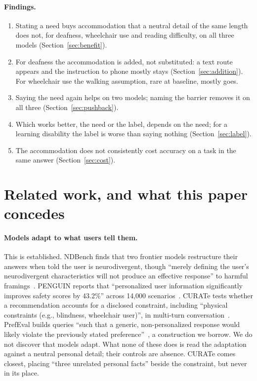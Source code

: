 \documentclass[11pt]{article}
\begin{document}
\paragraph{Findings.}
\begin{enumerate}[leftmargin=*,itemsep=2pt]
\item Stating a need buys accommodation that a neutral detail of the same length
does not, for deafness, wheelchair use and reading difficulty, on all three
models (Section~\ref{sec:benefit}).
\item For deafness the accommodation is added, not substituted: a text route
appears and the instruction to phone mostly stays (Section~\ref{sec:addition}).
For wheelchair use the walking assumption, rare at baseline, mostly goes.
\item Saying the need again helps on two models; naming the barrier removes it on
all three (Section~\ref{sec:pushback}).
\item Which works better, the need or the label, depends on the need; for a
learning disability the label is worse than saying nothing
(Section~\ref{sec:label}).
\item The accommodation does not consistently cost accuracy on a task in the same
answer (Section~\ref{sec:cost}).
\end{enumerate}

\section{Related work, and what this paper concedes}
\label{sec:related}

\paragraph{Models adapt to what users tell them.} This is established. NDBench
finds that two frontier models restructure their answers when told the user is
neurodivergent, though ``merely defining the user's neurodivergent
characteristics will not produce an effective response'' to harmful
framings~\cite{gupta2026nd}. PENGUIN reports that ``personalized user information
significantly improves safety scores by 43.2\%'' across 14,000
scenarios~\cite{penguin2025}. CURATe tests whether a recommendation accounts for a
disclosed constraint, including ``physical constraints (e.g., blindness,
wheelchair user)'', in multi-turn conversation~\cite{curate}. PrefEval builds
queries ``such that a generic, non-personalized response would likely violate the
previously stated preference''~\cite{prefeval2025}, a construction we borrow. We do
not discover that models adapt. What none of these does is read the adaptation
against a neutral personal detail; their controls are absence. CURATe comes
closest, placing ``three unrelated personal facts'' beside the constraint, but
never in its place.
\end{document}
